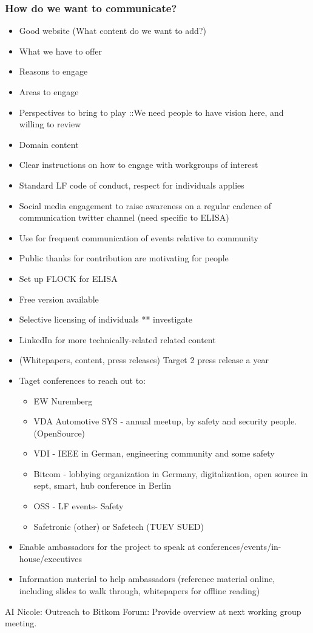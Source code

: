 \documentclass[12pt]{../Common_files/ElisaPaper}
\begin{document}
\subsubsection{How do we want to communicate?}
\begin{itemize}
	\item Good website (What content do we want to add?)
	\item What we have to offer
	\item Reasons to engage
	\item Areas to engage
	\item Perspectives to bring to play ::We need people to have vision here, and willing to review
	\item Domain content
	\item Clear instructions on how to engage with workgroups of interest
	\item Standard LF code of conduct,  respect for individuals applies
	\item Social media engagement to raise awareness 
	on a regular cadence of communication twitter channel
	(need specific to ELISA)
	\item Use for frequent communication of events relative to community
	\item Public thanks for contribution are motivating for people
	\item Set up FLOCK for ELISA
	\item Free version available
	\item Selective licensing of individuals
	** investigate
	\item LinkedIn for more technically-related related content
	\item (Whitepapers, content, press releases) Target 2 press release a year
	\item Taget conferences to reach out to:
	\begin{itemize}
		\item EW Nuremberg
		\item VDA Automotive SYS - annual meetup, by safety and security people.  (OpenSource)
		\item VDI - IEEE in German,  engineering community and some safety
		\item Bitcom - lobbying organization in Germany,  digitalization,  open source in sept,  smart,  hub conference in Berlin
		\item OSS - LF events- Safety
		\item Safetronic (other) or Safetech (TUEV SUED)
	\end{itemize}
	\item Enable ambassadors for the project to speak at conferences/events/in-house/executives 
	\item Information material to help ambassadors (reference material online, including slides to walk through, whitepapers for offline reading)
\end{itemize}
AI Nicole: Outreach to Bitkom Forum:  Provide overview at next working group meeting.
\end{document}
